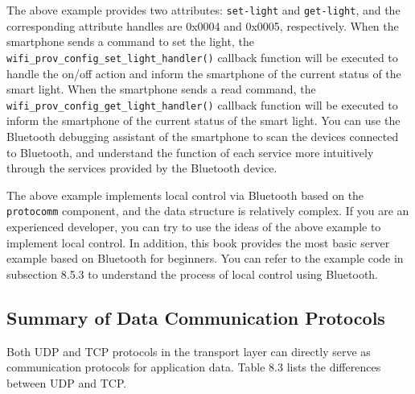 \documentclass[a4paper,12pt]{book}
\begin{document}
The above example provides two attributes: \verb|set-light| and \verb|get-light|, and the corresponding attribute handles are 0x0004 and 0x0005, respectively. When the smartphone sends a command to set the light, the \verb|wifi_prov_config_set_light_handler()| callback function will be executed to handle the on/off action and inform the smartphone of the current status of the smart light. When the smartphone sends a read command, the \verb|wifi_prov_config_get_light_handler()| callback function will be executed to inform the smartphone of the current status of the smart light. You can use the Bluetooth debugging assistant of the smartphone to scan the devices connected to Bluetooth, and understand the function of each service more intuitively through the services provided by the Bluetooth device.

The above example implements local control via Bluetooth based on the \verb|protocomm| component, and the data structure is relatively complex. If you are an experienced developer, you can try to use the ideas of the above example to implement local control. In addition, this book provides the most basic server example based on Bluetooth for beginners. You can refer to the example code in subsection 8.5.3 to understand the process of local control using Bluetooth.

\subsection{Summary of Data Communication Protocols}
Both UDP and TCP protocols in the transport layer can directly serve as communication protocols for application data. Table 8.3 lists the differences between UDP and TCP.
\end{document}
